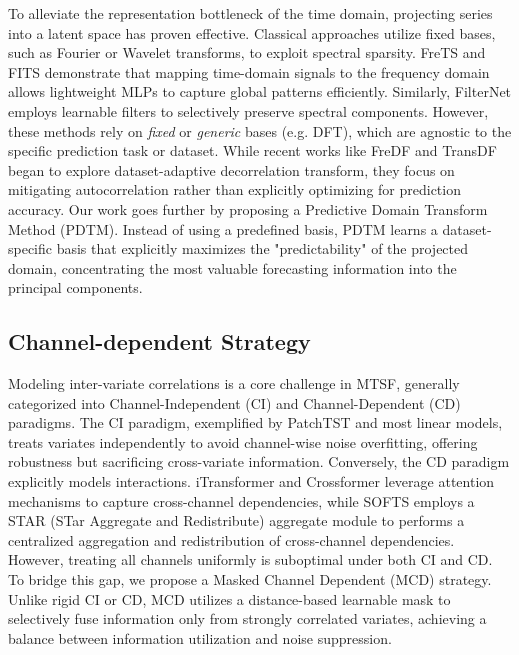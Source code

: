 \documentclass[final,3p,times]{elsarticle}
\begin{document}
To alleviate the representation bottleneck\cite{nie2023a} of the time domain, projecting series into a latent space has proven effective. Classical approaches utilize fixed bases, such as Fourier or Wavelet transforms, to exploit spectral sparsity. FreTS\cite{yi2023frequency} and FITS\cite{xu2024fits} demonstrate that mapping time-domain signals to the frequency domain allows lightweight MLPs to capture global patterns efficiently. Similarly, FilterNet\cite{yi2024filternet} employs learnable filters to selectively preserve spectral components. However, these methods rely on \textit{fixed} or \textit{generic} bases (e.g. DFT), which are agnostic to the specific prediction task or dataset. While recent works like FreDF\cite{wang2025fredf} and TransDF\cite{wang2025transdf} began to explore dataset-adaptive decorrelation transform, they focus on mitigating autocorrelation rather than explicitly optimizing for prediction accuracy. Our work goes further by proposing a Predictive Domain Transform Method (PDTM). Instead of using a predefined basis, PDTM learns a dataset-specific basis that explicitly maximizes the "predictability" of the projected domain, concentrating the most valuable forecasting information into the principal components.


\subsection{Channel-dependent Strategy}
Modeling inter-variate correlations is a core challenge in MTSF, generally categorized into Channel-Independent (CI) and Channel-Dependent (CD) paradigms. The CI paradigm, exemplified by PatchTST\cite{nie2023a} and most linear models\cite{zeng2023transformers, xu2024fits, yi2024filternet}, treats variates independently to avoid channel-wise noise overfitting, offering robustness but sacrificing cross-variate information. Conversely, the CD paradigm explicitly models interactions. iTransformer\cite{liu2024itransformer} and Crossformer\cite{zhang2023crossformer} leverage attention mechanisms to capture cross-channel dependencies, while SOFTS\cite{han2024softs} employs a STAR (STar Aggregate and Redistribute) aggregate module to performs a centralized aggregation and redistribution of cross-channel dependencies. However, treating all channels uniformly is suboptimal under both CI and CD. To bridge this gap, we propose a Masked Channel Dependent (MCD) strategy. Unlike rigid CI or CD, MCD utilizes a distance-based learnable mask to selectively fuse information only from strongly correlated variates, achieving a balance between information utilization and noise suppression.
\end{document}
